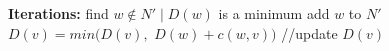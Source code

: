 \begin{itemize}
\begin{itemize}
\begin{figure}[!h]
\begin{minipage}{.75\linewidth}
\begin{algorithm}[H]
\begin{algorithmic}[1]
                        \EndIf
                    \EndFor
                    \State
                    \State \textbf{Iterations:}
                    \Repeat 
                    \State find $w \notin N' \mid D(w)$ is a minimum
                    \State add $w$ to $N'$
                        \State $D(v) = min(D(v),$ $D(w) + c(w,v))$ //update $D(v)$
                    \EndFor
                    \end{algorithmic}
                \end{algorithm}
            \end{minipage}
        \end{figure}
    \end{itemize}
\end{itemize}